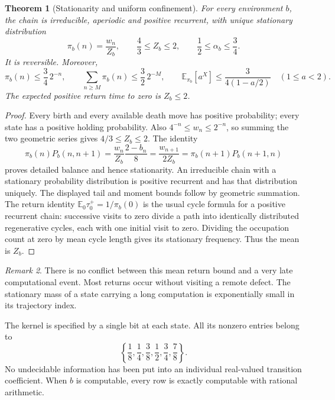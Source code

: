 \documentclass[11pt,letterpaper]{article}
\numberwithin{equation}{section}
\newtheorem{theorem}{Theorem}[section]
\theoremstyle{definition}
\theoremstyle{remark}
\newtheorem{remark}[theorem]{Remark}
\begin{document}
\begin{theorem}[Stationarity and uniform confinement]\label{pqc:rv:thm:stationary}
For every environment $b$, the chain is irreducible, aperiodic and
positive recurrent, with unique stationary distribution
\begin{equation}\label{pqc:rv:eq:stationary}
 \pi_b(n)=\frac{w_n}{Z_b},\qquad
 \frac43\leq Z_b\leq2,\qquad \frac12\leq\alpha_b\leq\frac34.
\end{equation}
It is reversible. Moreover,
\begin{equation}\label{pqc:rv:eq:tail}
 \pi_b(n)\leq\frac34\,2^{-n},\qquad
 \sum_{n\geq M}\pi_b(n)\leq\frac32\,2^{-M},\qquad
 \mathbb E_{\pi_b}[a^X]\leq\frac{3}{4(1-a/2)}\quad(1\leq a<2).
\end{equation}
The expected positive return time to zero is $Z_b\leq2$.
\end{theorem}
\begin{proof}
Every birth and every available death move has positive probability;
every state has a positive holding probability. Also
$4^{-n}\leq w_n\leq2^{-n}$, so summing the two geometric series gives
$4/3\leq Z_b\leq2$. The identity
\[
 \pi_b(n)P_b(n,n+1)=\frac{w_n}{Z_b}\frac{2-b_n}{8}
 =\frac{w_{n+1}}{2Z_b}
 =\pi_b(n+1)P_b(n+1,n)
\]
proves detailed balance and hence stationarity. An irreducible chain
with a stationary probability distribution is positive recurrent and
has that distribution uniquely. The displayed tail and moment bounds
follow by geometric summation. The return identity
$\mathbb E_0\tau_0^+=1/\pi_b(0)$ is the usual cycle formula for a
positive recurrent chain: successive visits to zero divide a path into
identically distributed regenerative cycles, each with one initial
visit to zero. Dividing the occupation count at zero by mean cycle
length gives its stationary frequency. Thus the mean is $Z_b$.
\end{proof}

\begin{remark}
There is no conflict between this mean return bound and a very late
computational event. Most returns occur without visiting a remote defect.
The stationary mass of a state carrying a long computation is
exponentially small in its trajectory index.
\end{remark}

The kernel is specified by a single bit at each state. All its nonzero
entries belong to
\[
 \left\{\frac18,\frac14,\frac38,\frac12,\frac34,\frac78\right\}.
\]
No undecidable information has been put into an individual real-valued
transition coefficient. When $b$ is computable, every row is exactly
computable with rational arithmetic.
\end{document}
